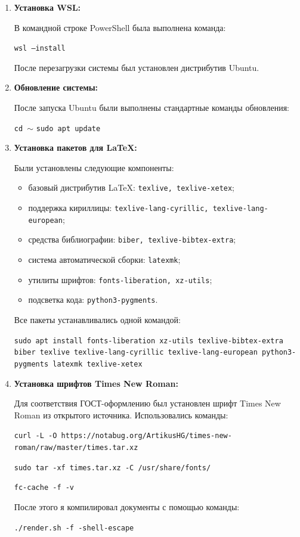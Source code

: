 \documentclass[a4paper,12pt]{report}
\newcommand{\mytilde}{$\sim$}
\begin{document}
\begin{enumerate}
    \item \textbf{Установка WSL:}
    
    В командной строке PowerShell была выполнена команда:

    \texttt{wsl --install}

    После перезагрузки системы был установлен дистрибутив Ubuntu.

    \item \textbf{Обновление системы:}

    После запуска Ubuntu были выполнены стандартные команды обновления:

    \texttt{cd \mytilde{}}  
    \texttt{sudo apt update}

    \item \textbf{Установка пакетов для \LaTeX{}:}

    Были установлены следующие компоненты:

    \begin{itemize}
        \item базовый дистрибутив \LaTeX{}: \texttt{texlive, texlive-xetex};
        \item поддержка кириллицы: \texttt{texlive-lang-cyrillic, texlive-lang-european};
        \item средства библиографии: \texttt{biber, texlive-bibtex-extra};
        \item система автоматической сборки: \texttt{latexmk};
        \item утилиты шрифтов: \texttt{fonts-liberation, xz-utils};
        \item подсветка кода: \texttt{python3-pygments}.
    \end{itemize}

    Все пакеты устанавливались одной командой:

    \texttt{sudo apt install fonts-liberation xz-utils texlive-bibtex-extra biber texlive texlive-lang-cyrillic texlive-lang-european python3-pygments latexmk texlive-xetex}

    \item \textbf{Установка шрифтов Times New Roman:}

    Для соответствия ГОСТ-оформлению был установлен шрифт Times New Roman из открытого источника. Использовались команды:

    \texttt{curl -L -O https://notabug.org/ArtikusHG/times-new-roman/raw/master/times.tar.xz}

    \texttt{sudo tar -xf times.tar.xz -C /usr/share/fonts/}

    \texttt{fc-cache -f -v}

    После этого я компилировал документы с помощью команды:

    \texttt{./render.sh -f -shell-escape}

\end{enumerate}
\end{document}
